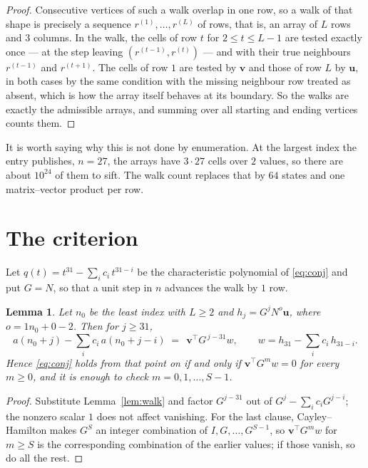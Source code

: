 \documentclass[11pt,a4paper]{article}
\theoremstyle{plain}
\newtheorem{lemma}[theorem]{Lemma}
\theoremstyle{definition}
\begin{document}
\begin{proof}
Consecutive vertices of such a walk overlap in one row, so a walk of that shape is
precisely a sequence $r^{(1)},\dots,r^{(L)}$ of rows, that is, an array of $L$ rows
and $3$ columns. In the walk, the cells of row $t$ for $2\le t\le L-1$ are tested
exactly once --- at the step leaving $(r^{(t-1)},r^{(t)})$ --- and with their true
neighbours $r^{(t-1)}$ and $r^{(t+1)}$. The cells of row $1$ are tested by
$\mathbf{v}$ and those of row $L$ by $\mathbf{u}$, in both cases by the same condition
with the missing neighbour row treated as absent, which is how the array itself behaves at
its boundary. So the walks are exactly the admissible arrays, and summing over all starting
and ending vertices counts them.
\end{proof}


It is worth saying why this is not done by enumeration. At the largest index the entry
publishes, $n=27$, the arrays have $3\cdot27$ cells over
$2$ values, so there are about $10^{24}$ of them to sift. The
walk count replaces that by $64$ states and one matrix--vector product per row.
\section{The criterion}

Let $q(t)=t^{31}-\sum_i c_i\,t^{31-i}$ be the characteristic polynomial of
\eqref{eq:conj} and put $G=N$, so that a unit step in $n$ advances the walk by
$1$ row.

\begin{lemma}\label{lem:crit}
Let $n_0$ be the least index with $L\ge2$ and $h_j=G^{j}N^{o}\mathbf{u}$, where
$o=1n_0+0-2$. Then for $j\ge31$,
\[
a(n_0+j)-\sum_i c_i\,a(n_0+j-i)\;=\;\,\mathbf{v}^{\!\top}G^{\,j-31}w,
\qquad w=h_{31}-\sum_i c_i\,h_{31-i} .
\]
Hence \eqref{eq:conj} holds from that point on if and only if
$\mathbf{v}^{\!\top}G^{m}w=0$ for every $m\ge0$, and it is enough to check
$m=0,1,\dots,S-1$.
\end{lemma}

\begin{proof}
Substitute Lemma~\ref{lem:walk} and factor $G^{j-31}$ out of
$G^{j}-\sum_ic_iG^{j-i}$; the nonzero scalar $1$ does not affect
vanishing. For the last clause, Cayley--Hamilton makes $G^{S}$ an integer combination of
$I,G,\dots,G^{S-1}$, so $\mathbf{v}^{\!\top}G^{m}w$ for $m\ge S$ is the corresponding
combination of the earlier values; if those vanish, so do all the rest.
\end{proof}
\end{document}
